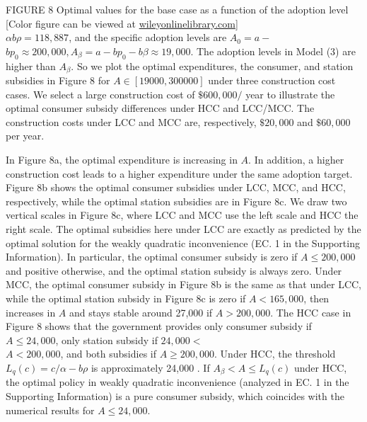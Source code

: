 \documentclass[10pt]{article}
\begin{document}
FIGURE 8 Optimal values for the base case as a function of the adoption level [Color figure can be viewed at \href{http://wileyonlinelibrary.com}{wileyonlinelibrary.com}]\\
$\alpha b \rho=118,887$, and the specific adoption levels are $A_{0}=a-$ $b p_{0} \approx 200,000, A_{\beta}=a-b p_{0}-b \beta \approx 19,000$. The adoption levels in Model (3) are higher than $A_{\beta}$. So we plot the optimal expenditures, the consumer, and station subsidies in Figure 8 for $A \in[19000,300000]$ under three construction cost cases. We select a large construction cost of $\$ 600,000 /$ year to illustrate the optimal consumer subsidy differences under HCC and LCC/MCC. The construction costs under LCC and MCC are, respectively, $\$ 20,000$ and $\$ 60,000$ per year.

In Figure 8a, the optimal expenditure is increasing in $A$. In addition, a higher construction cost leads to a higher expenditure under the same adoption target. Figure 8b shows the optimal consumer subsidies under LCC, MCC, and HCC, respectively, while the optimal station subsidies are in Figure 8c. We draw two vertical scales in Figure 8c, where LCC and MCC use the left scale and HCC the right scale. The optimal subsidies here under LCC are exactly as predicted by the optimal solution for the weakly quadratic inconvenience (EC. 1 in the Supporting Information). In particular, the optimal consumer subsidy is zero if $A \leq 200,000$ and positive otherwise, and the optimal station subsidy is always zero. Under MCC, the optimal consumer subsidy in Figure 8b is the same as that under LCC, while the optimal station subsidy in Figure 8c is zero if $A<165,000$, then increases in $A$ and stays stable around 27,000 if $A>200,000$. The HCC case in Figure 8 shows that the government provides only consumer subsidy if $A \leq 24,000$, only station subsidy if $24,000<$\\
$A<200,000$, and both subsidies if $A \geq 200,000$. Under HCC, the threshold $L_{q}(c)=c / \alpha-b \rho$ is approximately 24,000 . If $A_{\beta}<A \leq L_{q}(c)$ under HCC, the optimal policy in weakly quadratic inconvenience (analyzed in EC. 1 in the Supporting Information) is a pure consumer subsidy, which coincides with the numerical results for $A \leq 24,000$.
\end{document}
